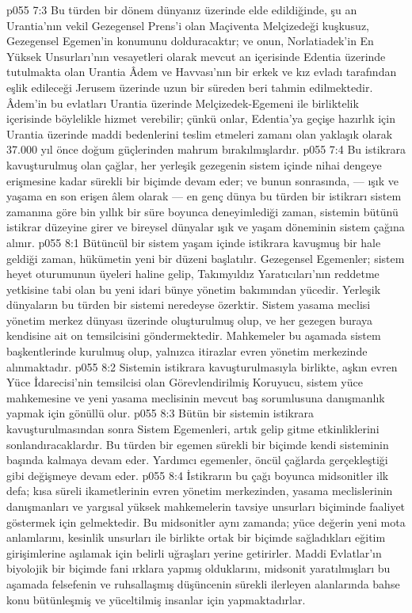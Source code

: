 \vs p055 7:3 Bu türden bir dönem dünyanız üzerinde elde edildiğinde, şu an Urantia’nın vekil Gezegensel Prens’i olan Maçiventa Melçizedeği kuşkusuz, Gezegensel Egemen’in konumunu dolduracaktır; ve onun, Norlatiadek’in En Yüksek Unsurları’nın vesayetleri olarak mevcut an içerisinde Edentia üzerinde tutulmakta olan Urantia Âdem ve Havvası’nın bir erkek ve kız evladı tarafından eşlik edileceği Jerusem üzerinde uzun bir süreden beri tahmin edilmektedir. Âdem’in bu evlatları Urantia üzerinde Melçizedek\hyp{}Egemeni ile birliktelik içerisinde böylelikle hizmet verebilir; çünkü onlar, Edentia’ya geçişe hazırlık için Urantia üzerinde maddi bedenlerini teslim etmeleri zamanı olan yaklaşık olarak 37.000 yıl önce doğum güçlerinden mahrum bırakılmışlardır.
\vs p055 7:4 Bu istikrara kavuşturulmuş olan çağlar, her yerleşik gezegenin sistem içinde nihai dengeye erişmesine kadar sürekli bir biçimde devam eder; ve bunun sonrasında, --- ışık ve yaşama en son erişen âlem olarak --- en genç dünya bu türden bir istikrarı sistem zamanına göre bin yıllık bir süre boyunca deneyimlediği zaman, sistemin bütünü istikrar düzeyine girer ve bireysel dünyalar ışık ve yaşam döneminin sistem çağına alınır.
\vs p055 8:1 Bütüncül bir sistem yaşam içinde istikrara kavuşmuş bir hale geldiği zaman, hükümetin yeni bir düzeni başlatılır. Gezegensel Egemenler; sistem heyet oturumunun üyeleri haline gelip, Takımyıldız Yaratıcıları’nın reddetme yetkisine tabi olan bu yeni idari bünye yönetim bakımından yücedir. Yerleşik dünyaların bu türden bir sistemi neredeyse özerktir. Sistem yasama meclisi yönetim merkez dünyası üzerinde oluşturulmuş olup, ve her gezegen buraya kendisine ait on temsilcisini göndermektedir. Mahkemeler bu aşamada sistem başkentlerinde kurulmuş olup, yalnızca itirazlar evren yönetim merkezinde alınmaktadır.
\vs p055 8:2 Sistemin istikrara kavuşturulmasıyla birlikte, aşkın evren Yüce İdarecisi’nin temsilcisi olan Görevlendirilmiş Koruyucu, sistem yüce mahkemesine ve yeni yasama meclisinin mevcut baş sorumlusuna danışmanlık yapmak için gönüllü olur.
\vs p055 8:3 Bütün bir sistemin istikrara kavuşturulmasından sonra Sistem Egemenleri, artık gelip gitme etkinliklerini sonlandıracaklardır. Bu türden bir egemen sürekli bir biçimde kendi sisteminin başında kalmaya devam eder. Yardımcı egemenler, öncül çağlarda gerçekleştiği gibi değişmeye devam eder.
\vs p055 8:4 İstikrarın bu çağı boyunca midsonitler ilk defa; kısa süreli ikametlerinin evren yönetim merkezinden, yasama meclislerinin danışmanları ve yargısal yüksek mahkemelerin tavsiye unsurları biçiminde faaliyet göstermek için gelmektedir. Bu midsonitler aynı zamanda; yüce değerin yeni mota anlamlarını, kesinlik unsurları ile birlikte ortak bir biçimde sağladıkları eğitim girişimlerine aşılamak için belirli uğraşları yerine getirirler. Maddi Evlatlar’ın biyolojik bir biçimde fani ırklara yapmış olduklarını, midsonit yaratılmışları bu aşamada felsefenin ve ruhsallaşmış düşüncenin sürekli ilerleyen alanlarında bahse konu bütünleşmiş ve yüceltilmiş insanlar için yapmaktadırlar.
